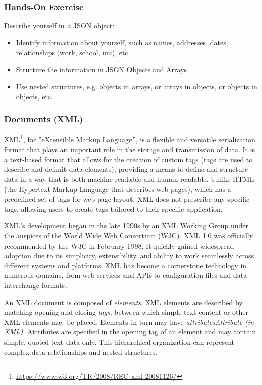 \begin{tcolorbox}[colback=code]
\subsubsection*{Hands-On Exercise} 

Describe yourself in a JSON object:
\begin{itemize}
	\item Identify information about yourself, such as names, addresses, dates, relationships (work, school, uni), etc.
	\item Structure the information in JSON Objects and Arrays 
	\item Use nested structures, e.g. objects in arrays, or arrays in objects, or objects in objects, etc.
\end{itemize}
\end{tcolorbox}

\subsubsection*{Documents (XML)}

XML\footnote{\url{https://www.w3.org/TR/2008/REC-xml-20081126/}}, for ''eXtensible Markup Language'', is a flexible and versatile serialization format that plays an important role in the storage and transmission of data. It is a text-based format that allows for the creation of custom tags (tags are used to describe and delimit data elements), providing a means to define and structure data in a way that is both machine-readable and human-readable. Unlike HTML (the Hypertext Markup Language that describes web pages), which has a predefined set of tags for web page layout, XML does not prescribe any specific tags, allowing users to create tags tailored to their specific application.

XML's development began in the late 1990s by an XML Working Group under the auspices of the World Wide Web Consortium (W3C). XML 1.0 was officially recommended by the W3C in February 1998. It quickly gained widespread adoption due to its simplicity, extensibility, and ability to work seamlessly across different systems and platforms. XML has become a cornerstone technology in numerous domains, from web services and APIs to configuration files and data interchange formats.

An XML document is composed of \emph{elements}. XML elements are described by matching opening and closing \emph{tags}, between which simple text content or other XML elements may be placed. Elements in turn may have \emph{attributes}\emph{Attribute (in XML)}. Attributes are specified in the opening tag of an element and may contain simple, quoted text data only. This hierarchical organization can represent complex data relationships and nested structures. 

